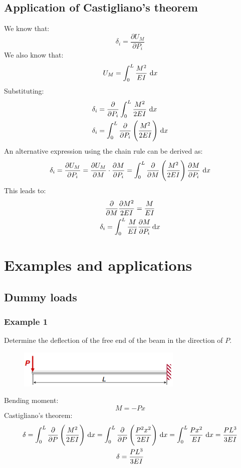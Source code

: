 \documentclass[class=report, crop=false, 12pt,a4paper]{standalone}
\begin{document}
\subsection{Application of Castigliano's theorem}
We know that:
\begin{equation}
  \delta_i = \frac{\partial U_M}{\partial P_i}
\end{equation}
We also know that:
\begin{equation}
  U_M = \int_0^L \frac{M^2}{EI}\, \dif x
\end{equation}
Substituting:
\begin{align}
  \delta_i &= \frac{\partial}{\partial P_i} \int_0^L \frac{M^2}{2EI} \, \dif x\\
  \delta_i &= \int_0^L \frac{\partial}{\partial P_i} \left(\frac{M^2}{2EI}\right) \, \dif x 
\end{align}
An alternative expression using the chain rule can be derived as:
\begin{gather}
  \delta_i = \frac{\partial U_M}{\partial P_i} = \frac{\partial U_M}{\partial M} \cdot \frac{\partial M}{\partial P_i} = \int_0^L \frac{\partial}{\partial M} \left(\frac{M^2}{2EI}\right)\frac{\partial M}{\partial P_i} \, \dif x
\end{gather}
This leads to:
\begin{gather}
  \frac{\partial}{\partial M} \frac{\partial M^2}{2EI} = \frac{M}{EI}\\
  \delta_i = \int_0^L \frac{M}{EI} \frac{\partial M}{\partial P_i}\dif x
\end{gather}
\section{Examples and applications}
\subsection{Dummy loads}
\subsubsection{Example 1}
Determine the deflection of the free end of the beam in the direction of $P$.
\begin{figure}[H]
  \centering
  \includegraphics[width = 0.7\textwidth]{../img/diagram15.png}
  \caption{}
\end{figure}
Bending moment:
\begin{equation}
  M = -P x
\end{equation}
Castigliano's theorem:
\begin{gather}
  \delta = \int_0^L \frac{\partial}{\partial P} \left(\frac{M^2}{2EI}\right) \, \dif x = \int_0^L \frac{\partial }{\partial P} \left(\frac{P^2 x^2}{2EI}\right)\, \dif x = \int_0^L \frac{Px^2}{EI} \, \dif x = \frac{PL^3}{3EI}\\
  \delta = \frac{PL^3}{3EI}
\end{gather}
\end{document}
